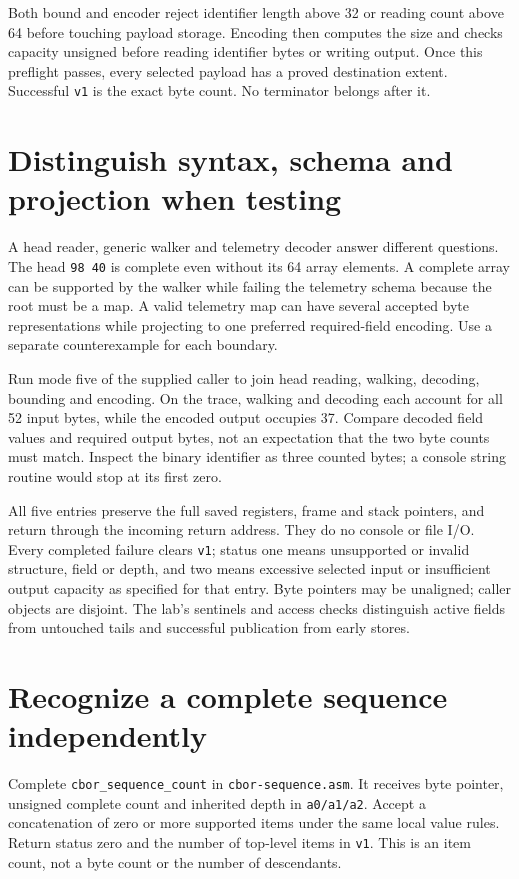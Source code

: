 Both bound and encoder reject identifier length above 32 or reading count above
64 before touching payload storage. Encoding then computes the size and checks
capacity unsigned before reading identifier bytes or writing output. Once this
preflight passes, every selected payload has a proved destination extent.
Successful \texttt{v1} is the exact byte count. No terminator belongs after it.

\section{Distinguish syntax, schema and projection when testing}

A head reader, generic walker and telemetry decoder answer different questions.
The head \texttt{98 40} is complete even without its 64 array elements. A complete
array can be supported by the walker while failing the telemetry schema because
the root must be a map. A valid telemetry map can have several accepted byte
representations while projecting to one preferred required-field encoding.
Use a separate counterexample for each boundary.

Run mode five of the supplied caller to join head reading, walking, decoding,
bounding and encoding. On the trace, walking and decoding each account for all
52 input bytes, while the encoded output occupies 37. Compare decoded field
values and required output bytes, not an expectation that the two byte counts
must match. Inspect the binary identifier as three counted bytes; a console
string routine would stop at its first zero.

All five entries preserve the full saved registers, frame and stack pointers,
and return through the incoming return address. They do no console or file I/O.
Every completed failure clears \texttt{v1}; status one means unsupported or invalid
structure, field or depth, and two means excessive selected input or insufficient
output capacity as specified for that entry. Byte pointers may be unaligned;
caller objects are disjoint. The lab's sentinels and access checks distinguish
active fields from untouched tails and successful publication from early stores.

\section{Recognize a complete sequence independently}

Complete \texttt{cbor\_sequence\_count} in \texttt{cbor-sequence.asm}. It receives
byte pointer, unsigned complete count and inherited depth in \texttt{a0/a1/a2}.
Accept a concatenation of zero or more supported items under the same local
value rules. Return status zero and the number of top-level items in \texttt{v1}.
This is an item count, not a byte count or the number of descendants.

